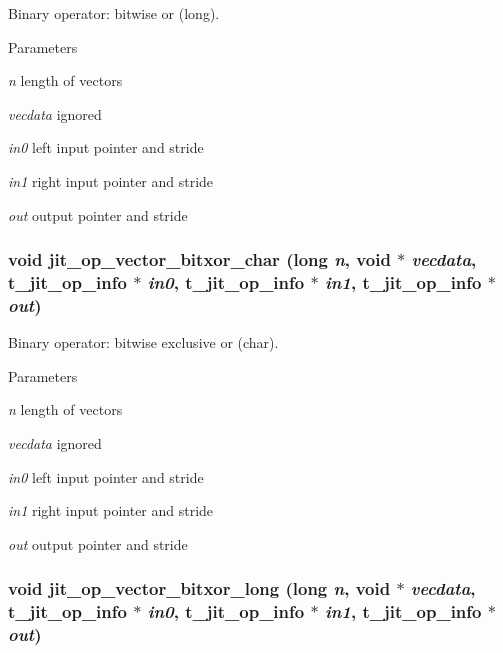 Binary operator: bitwise or (long). 
\begin{DoxyParams}{Parameters}
\item[{\em n}]length of vectors \item[{\em vecdata}]ignored \item[{\em in0}]left input pointer and stride \item[{\em in1}]right input pointer and stride \item[{\em out}]output pointer and stride \end{DoxyParams}
\hypertarget{group__opvecmod_ga111c6eea3e8f091ca2e18b1f4a447673}{
\subsubsection[{jit\_\-op\_\-vector\_\-bitxor\_\-char}]{\setlength{\rightskip}{0pt plus 5cm}void jit\_\-op\_\-vector\_\-bitxor\_\-char (long {\em n}, \/  void $\ast$ {\em vecdata}, \/  {\bf t\_\-jit\_\-op\_\-info} $\ast$ {\em in0}, \/  {\bf t\_\-jit\_\-op\_\-info} $\ast$ {\em in1}, \/  {\bf t\_\-jit\_\-op\_\-info} $\ast$ {\em out})}}
\label{group__opvecmod_ga111c6eea3e8f091ca2e18b1f4a447673}


Binary operator: bitwise exclusive or (char). 
\begin{DoxyParams}{Parameters}
\item[{\em n}]length of vectors \item[{\em vecdata}]ignored \item[{\em in0}]left input pointer and stride \item[{\em in1}]right input pointer and stride \item[{\em out}]output pointer and stride \end{DoxyParams}
\hypertarget{group__opvecmod_ga5ddfa9c091f3f2bf01e498ad6bfd2a67}{
\subsubsection[{jit\_\-op\_\-vector\_\-bitxor\_\-long}]{\setlength{\rightskip}{0pt plus 5cm}void jit\_\-op\_\-vector\_\-bitxor\_\-long (long {\em n}, \/  void $\ast$ {\em vecdata}, \/  {\bf t\_\-jit\_\-op\_\-info} $\ast$ {\em in0}, \/  {\bf t\_\-jit\_\-op\_\-info} $\ast$ {\em in1}, \/  {\bf t\_\-jit\_\-op\_\-info} $\ast$ {\em out})}}
\label{group__opvecmod_ga5ddfa9c091f3f2bf01e498ad6bfd2a67}


